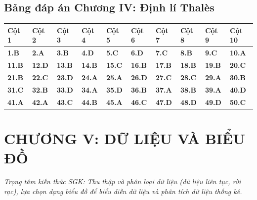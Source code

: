 \documentclass[11pt,a4paper]{article}
\begin{document}
\subsection*{\color{primary} Bảng đáp án Chương IV: Định lí Thalès}
\begin{center}
\renewcommand{\arraystretch}{1.25}
\begin{tabularx}{\textwidth}{*{10}{>{\centering\arraybackslash}X}}
\toprule
\textbf{\color{primary} Cột 1} & \textbf{\color{primary} Cột 2} & \textbf{\color{primary} Cột 3} & \textbf{\color{primary} Cột 4} & \textbf{\color{primary} Cột 5} & \textbf{\color{primary} Cột 6} & \textbf{\color{primary} Cột 7} & \textbf{\color{primary} Cột 8} & \textbf{\color{primary} Cột 9} & \textbf{\color{primary} Cột 10} \\
\midrule
\textbf{1.B} & \textbf{2.A} & \textbf{3.B} & \textbf{4.D} & \textbf{5.C} & \textbf{6.D} & \textbf{7.C} & \textbf{8.B} & \textbf{9.C} & \textbf{10.A} \\
\rowcolor{rowtint} \textbf{11.B} & \textbf{12.D} & \textbf{13.B} & \textbf{14.B} & \textbf{15.C} & \textbf{16.B} & \textbf{17.B} & \textbf{18.B} & \textbf{19.B} & \textbf{20.C} \\
\textbf{21.B} & \textbf{22.C} & \textbf{23.D} & \textbf{24.A} & \textbf{25.A} & \textbf{26.D} & \textbf{27.C} & \textbf{28.C} & \textbf{29.A} & \textbf{30.B} \\
\rowcolor{rowtint} \textbf{31.C} & \textbf{32.B} & \textbf{33.D} & \textbf{34.A} & \textbf{35.D} & \textbf{36.B} & \textbf{37.A} & \textbf{38.B} & \textbf{39.A} & \textbf{40.D} \\
\textbf{41.A} & \textbf{42.A} & \textbf{43.C} & \textbf{44.B} & \textbf{45.A} & \textbf{46.C} & \textbf{47.D} & \textbf{48.D} & \textbf{49.D} & \textbf{50.C} \\
\bottomrule
\end{tabularx}
\end{center}\vspace{10pt}
\section*{\color{primary} CHƯƠNG V: DỮ LIỆU VÀ BIỂU ĐỒ}
\textit{Trọng tâm kiến thức SGK: Thu thập và phân loại dữ liệu (dữ liệu liên tục, rời rạc), lựa chọn dạng biểu đồ để biểu diễn dữ liệu và phân tích dữ liệu thống kê.}\par\vspace{4pt}
\end{document}
